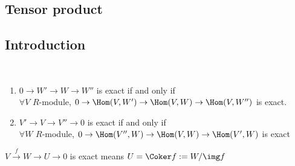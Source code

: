 \subsection{Tensor product}
\subsection{Introduction}
\begin{proposition}\,\label{exact_tensor}
    \begin{enumerate}[(1)]
         \item $ 0\rightarrow W'\rightarrow W\rightarrow W'' $ is exact if and only if \\
          $ \forall V $  $ R  $-module,  $ 0\rightarrow \Hom(V,W')\rightarrow \Hom(V,W)\rightarrow \Hom(V,W'') $ is exact.
          \item  $ V'\rightarrow V\rightarrow V''\rightarrow 0$ is exact if and only if \\
          $ \forall W $  $  R  $-module,  $ 0\rightarrow \Hom(V'',W)\rightarrow\Hom(V,W)\rightarrow\Hom(V',W) $ is exact   
    \end{enumerate}
\end{proposition}
\begin{proposition}\label{coker exact sequence}
     $ V\xrightarrow{f}W\rightarrow U\rightarrow 0 $ is exact means  $ U=\Coker f:=W/\img f $  
\end{proposition}
